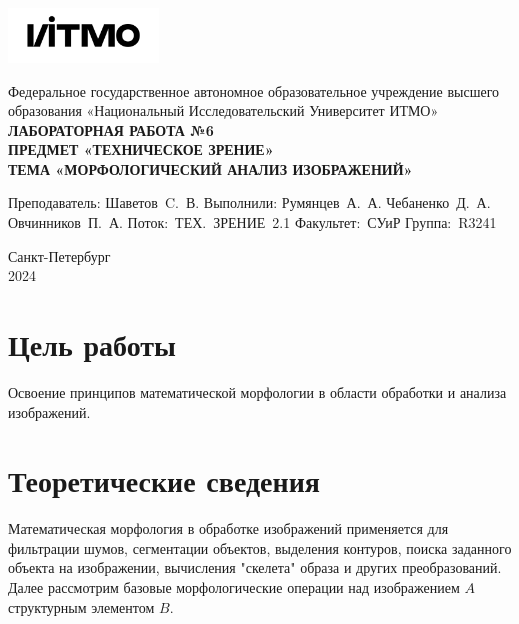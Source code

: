 \documentclass[a4paper, 12pt]{article}
\begin{document}
    \begin{titlepage}

        \begin{center}
        \includegraphics[width=0.3\textwidth]{itmo.png} %
        \vfill

        Федеральное государственное автономное образовательное учреждение высшего образования
        «Национальный Исследовательский Университет ИТМО»\\

        \vfill
        {\large\bf ЛАБОРАТОРНАЯ РАБОТА №6}\\
        {\large\bf ПРЕДМЕТ «ТЕХНИЧЕСКОЕ ЗРЕНИЕ»}\\
        {\large\bf ТЕМА «МОРФОЛОГИЧЕСКИЙ АНАЛИЗ ИЗОБРАЖЕНИЙ»}
        \vfill

        \begin{flushright}
            \begin{minipage}{.45\textwidth}
            {
                \hbox{Преподаватель:}
                \hbox{Шаветов C. В.}
                \hbox{}
                \hbox{Выполнили:} 
                \hbox{Румянцев А. А.}
                \hbox{Чебаненко Д. А.}
                \hbox{Овчинников П. А.}
                \hbox{}
                \hbox{Поток: ТЕХ. ЗРЕНИЕ 2.1}
                \hbox{Факультет: СУиР}
                \hbox{Группа: R3241}
            }
            \end{minipage}
        \end{flushright}

        \vfill

        Санкт-Петербург\\
        2024
        \end{center}
    \end{titlepage}

    \tableofcontents

    \newpage
    \section{Цель работы}
    Освоение принципов математической морфологии в области обработки и анализа изображений.

    
    \section{Теоретические сведения}
    Математическая морфология в обработке изображений применяется для фильтрации шумов, сегментации
    объектов, выделения контуров, поиска заданного объекта на изображении, вычисления "скелета" образа и
    других преобразований. Далее рассмотрим базовые морфологические операции над изображением $A$ структурным
    элементом $B$.
\end{document}
